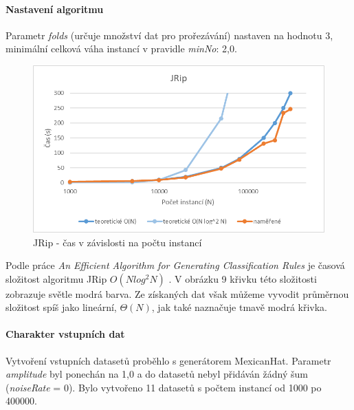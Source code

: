 \documentclass[12pt]{article}
\begin{document}
\paragraph{Nastavení algoritmu}
Parametr \textit{folds} (určuje množství dat pro prořezávání) nastaven na hodnotu 3, minimální celková váha instancí v pravidle \textit{minNo}: 2,0.
\begin{figure}[hbp]
  \centering
  \includegraphics[scale=1]{img/jrip.png}
  \caption{JRip - čas v závislosti na počtu instancí}
\end{figure}
Podle práce \textit{An Efficient Algorithm for Generating Classification Rules} je časová složitost algoritmu JRip $O(N log^2 N)$ \citep{vijay}. V obrázku 9 křivku této složitosti zobrazuje světle modrá barva. Ze získaných dat však můžeme vyvodit průměrnou složitost spíš jako lineární, $\Theta(N)$, jak také naznačuje tmavě modrá křivka.

\newpage
{}
\paragraph{Charakter vstupních dat}
Vytvoření vstupních datasetů proběhlo s generátorem MexicanHat. Parametr \textit{amplitude} byl ponechán na 1,0 a do datasetů nebyl přidáván žádný šum (\textit{noiseRate} = 0). Bylo vytvořeno 11 datasetů s počtem instancí od 1000 po 400000.
\end{document}
